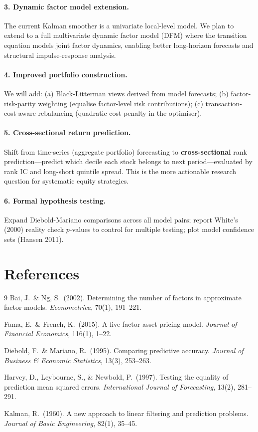 \documentclass{article}
\begin{document}
\paragraph{3. Dynamic factor model extension.}
The current Kalman smoother is a univariate local-level model. We plan to extend to a full
multivariate dynamic factor model (DFM) where the transition equation models joint factor dynamics,
enabling better long-horizon forecasts and structural impulse-response analysis.

\paragraph{4. Improved portfolio construction.}
We will add: (a) Black-Litterman views derived from model forecasts; (b) factor-risk-parity
weighting (equalise factor-level risk contributions); (c) transaction-cost-aware rebalancing
(quadratic cost penalty in the optimiser).

\paragraph{5. Cross-sectional return prediction.}
Shift from time-series (aggregate portfolio) forecasting to \textbf{cross-sectional} rank
prediction---predict which decile each stock belongs to next period---evaluated by rank IC and
long-short quintile spread. This is the more actionable research question for systematic equity
strategies.

\paragraph{6. Formal hypothesis testing.}
Expand Diebold-Mariano comparisons across all model pairs; report White's (2000) reality check
$p$-values to control for multiple testing; plot model confidence sets (Hansen 2011).

\section*{References}
\begin{thebibliography}{9}
Bai, J.\ \& Ng, S.\ (2002).
Determining the number of factors in approximate factor models.
\textit{Econometrica}, 70(1), 191--221.

Fama, E.\ \& French, K.\ (2015).
A five-factor asset pricing model.
\textit{Journal of Financial Economics}, 116(1), 1--22.

Diebold, F.\ \& Mariano, R.\ (1995).
Comparing predictive accuracy.
\textit{Journal of Business \& Economic Statistics}, 13(3), 253--263.

Harvey, D., Leybourne, S., \& Newbold, P.\ (1997).
Testing the equality of prediction mean squared errors.
\textit{International Journal of Forecasting}, 13(2), 281--291.

Kalman, R.\ (1960).
A new approach to linear filtering and prediction problems.
\textit{Journal of Basic Engineering}, 82(1), 35--45.
\end{thebibliography}
\end{document}
